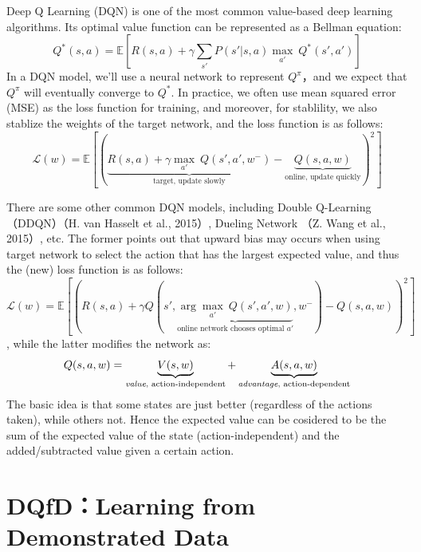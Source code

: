 \documentclass[a0,portrait]{a0poster}
\begin{document}
\begin{multicols}{2}
Deep Q Learning (DQN) is one of the most common value-based deep learning algorithms. Its optimal value function can be represented as a Bellman equation:
\[Q^*(s,a) = \mathbb{E}\left[R(s,a) + \gamma \sum_{s'}P(s'|s,a) \underset{a'}\max\ Q^*(s',a')\right]\]
In a DQN model, we'll use a neural network to represent $Q^\pi$，and we expect that $Q^\pi$ will eventually converge to $Q^*$. In practice, we often use mean squared error (MSE) as the loss function for training, and moreover, for stablility, we also stablize the weights of the target network, and the loss function is as follows:
\[\mathcal{L}(w) = \mathbb{E}\left[\left(\underbrace{R(s,a) + \gamma \underset{a'}\max\ Q(s',a', w^-)}_{\text{target, update slowly}} - \underbrace{Q(s,a,w)}_{\text{online, update quickly}}\right)^2\right]\]
\par
There are some other common DQN models, including Double Q-Learning（DDQN）（H. van Hasselt et al., 2015）\cite{DBLP:journals/corr/HasseltGS15}, Dueling Network （Z. Wang et al., 2015）\cite{DBLP:journals/corr/WangFL15}, etc. The former points out that upward bias may occurs when using target network to select the action that has the largest expected value, and thus the (new) loss function is as follows:
\[\mathcal{L}(w) = \mathbb{E}\left[\left(R(s,a) + \gamma Q(s',\underbrace{\arg \underset{a'}\max\ Q(s',a',w)}_{\text{online network chooses optimal } a'}, w^-) - Q(s,a,w)\right)^2\right]\], while the latter modifies the network as:
\[Q(s,a,w) = \underbrace{V(s,w)}_{\text{\emph{value}, action-independent}} + \underbrace{A(s,a,w)}_{\text{\emph{advantage}, action-dependent}}\]
The basic idea is that some states are just better (regardless of the actions taken), while others not. Hence the expected value can be cosidered to be the sum of the expected value of the state (action-independent) and the added/subtracted value given a certain action.




\section*{DQfD：Learning from Demonstrated Data}



\end{multicols}
\end{document}
